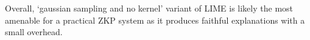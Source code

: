 





Overall, `gaussian sampling and no kernel' variant of LIME is likely the most amenable for a practical ZKP system as it produces faithful explanations with a small overhead.
 


